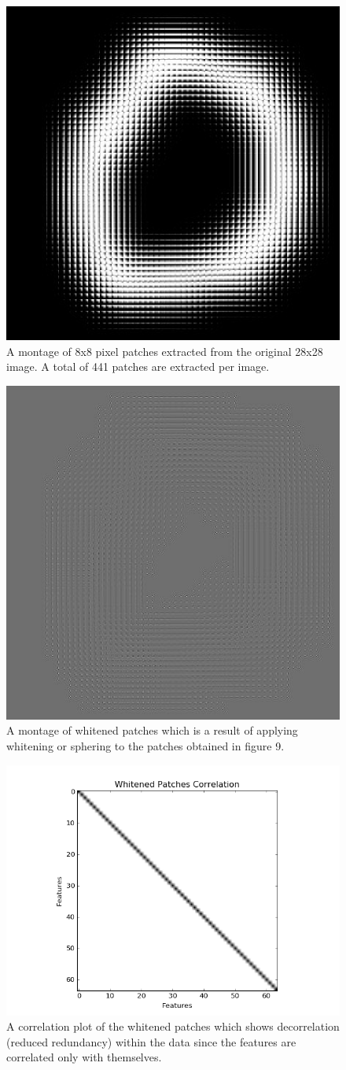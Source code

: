 \documentclass[	DIV=calc,%
				paper=a4,%
				fontsize=11pt,%
				twocolumn]{scrartcl}	 %
\begin{document}
\begin{figure}[H]
    \centering
    \includegraphics[width=0.45\linewidth]{data/sc_data/sc_mnist_patches_montage.jpg}
    \caption{A montage of 8x8 pixel patches extracted from the original 28x28 image. A total of 441 patches are extracted per image.}
    \label{sc_mnist_patches_montage}
\end{figure}


\begin{figure}[H]
    \centering
    \includegraphics[width=0.45\linewidth]{data/sc_data/sc_mnist_whitened_patches_montage.jpg}
    \caption{A montage of whitened patches which is a result of applying whitening or sphering to the patches obtained in figure 9.}
    \label{sc_mnist_whitened_patches_montage}
\end{figure}
 
 
\begin{figure}[H]
    \centering
    \includegraphics[width=0.8\linewidth]{data/sc_data/sc_mnist_whitened_patches_correlation.png}
    \caption{A correlation plot of the whitened patches which shows decorrelation (reduced redundancy) within the data since the features are correlated only with themselves.}
    \label{sc_mnist_whitened_patches_correlation}
\end{figure}
\end{document}
